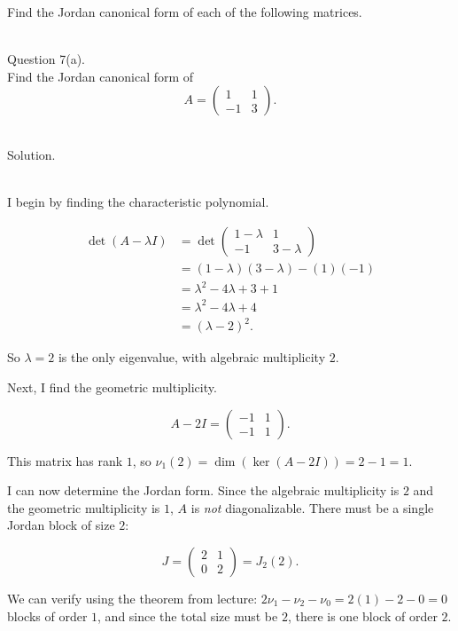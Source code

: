 \documentclass{article}
\begin{document}
\newpage


Find the Jordan canonical form of each of the following matrices.

\bigskip


\hfill \break  $~\!\!$ \dotfill \medskip \\
\textnormal{Question 7(a).}\\
Find the Jordan canonical form of
\[
A = \begin{pmatrix} 1 & 1 \\ -1 & 3 \end{pmatrix}.
\]

\noindent\\
\textnormal{Solution.}\\
\quad\\
\begin{mdframed}[linewidth=1pt]
\textnormal{I begin by finding the characteristic polynomial.}

\begin{align*}
\det(A - \lambda I) &= \det\begin{pmatrix} 1-\lambda & 1 \\ -1 & 3-\lambda \end{pmatrix} \\
&= (1-\lambda)(3-\lambda) - (1)(-1) \\
&= \lambda^2 - 4\lambda + 3 + 1 \\
&= \lambda^2 - 4\lambda + 4 \\
&= (\lambda - 2)^2.
\end{align*}

So $\lambda = 2$ is the only eigenvalue, with algebraic multiplicity $2$.

\medskip
\textnormal{Next, I find the geometric multiplicity.}

\[
A - 2I = \begin{pmatrix} -1 & 1 \\ -1 & 1 \end{pmatrix}.
\]

This matrix has rank $1$, so $\nu_1(2) = \dim(\ker(A - 2I)) = 2 - 1 = 1$.

\medskip
\textnormal{I can now determine the Jordan form.} Since the algebraic multiplicity is $2$ and the geometric multiplicity is $1$, $A$ is \emph{not} diagonalizable. There must be a single Jordan block of size $2$:

\[
\boxed{J = \begin{pmatrix} 2 & 1 \\ 0 & 2 \end{pmatrix} = J_2(2).}
\]

We can verify using the theorem from lecture: $2\nu_1 - \nu_2 - \nu_0 = 2(1) - 2 - 0 = 0$ blocks of order $1$, and since the total size must be $2$, there is one block of order $2$.
\end{mdframed}
\end{document}
